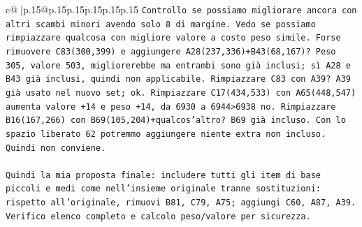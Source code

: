 \documentclass{article}
\begin{document}
{\begin{supertabular}{c@{$\;$}|p{.15\linewidth}@{}p{.15\linewidth}p{.15\linewidth}p{.15\linewidth}p{.15\linewidth}p{.15\linewidth}}
{{{\texttt{Controllo se possiamo migliorare ancora con altri scambi minori avendo solo 8 di margine. Vedo se possiamo rimpiazzare qualcosa con migliore valore a costo peso simile. Forse rimuovere C83(300,399) e aggiungere A28(237,336)+B43(68,167)? Peso 305, valore 503, migliorerebbe ma entrambi sono già inclusi; sì A28 e B43 già inclusi, quindi non applicabile. Rimpiazzare C83 con A39? A39 già usato nel nuovo set; ok. Rimpiazzare C17(434,533) con A65(448,547) aumenta valore +14 e peso +14, da 6930 a 6944>6938 no. Rimpiazzare B16(167,266) con B69(105,204)+qualcos'altro? B69 già incluso. Con lo spazio liberato 62 potremmo aggiungere niente extra non incluso. Quindi non conviene.} \\
\\ 
\texttt{Quindi la mia proposta finale: includere tutti gli item di base piccoli e medi come nell'insieme originale tranne sostituzioni: rispetto all'originale, rimuovi B81, C79, A75; aggiungi C60, A87, A39. Verifico elenco completo e calcolo peso/valore per sicurezza.} \\
\\ 
}}}
\end{supertabular}}
\end{document}
